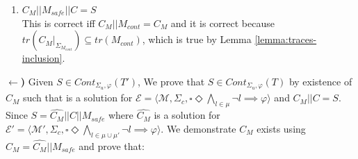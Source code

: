 \begin{enumerate}
\begin{enumerate}
    \end{enumerate}
    Then, $C_M$ is a valid solution for $\mathcal{E'}$. \\
    
    \item $C_M || M_{safe} || C = S$ \\
    This is correct iff $C_M || M_{cont} = C_M$ and it is correct because $tr(C_M |_{\Sigma_{M_{cont}}}) \subseteq tr(M_{cont})$, which is true by Lemma \ref{lemma:traces-inclusion}.
\end{enumerate}

\textbf{$\xleftarrow[]{}$)} Given $S \in Cont_{\Sigma_u, \varphi}(T')$, We prove that $S \in Cont_{\Sigma_u, \varphi}(T)$  by existence of $C_{M}$ such that is a solution for $\mathcal{E} = \langle \mathcal{M}, \Sigma_c, \square \Diamond \bigwedge_{l \in \mu} \neg l \implies \varphi \rangle$ and $C_M || C = S$. Since $S = \hat{C_M} || C || M_{safe}$ where $\hat{C_M}$ is a solution for  $\mathcal{E'} = \langle \mathcal{M'}, \Sigma_c, \square \Diamond \bigwedge_{l \in \mu \cup \mu'} \neg l \implies \varphi \rangle$.
We demonstrate $C_M$ exists using $C_M = \hat{C_{M}} || M_{safe}$ and prove that:

